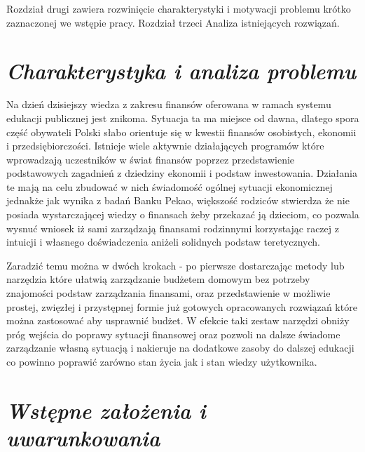 \documentclass[a4paper,10pt, twoside]{report}
\newcommand{\customstylechapter}[1]{\large{\textit{#1}}}
\begin{document}
{Rozdział drugi zawiera rozwinięcie charakterystyki i motywacji problemu krótko 
zaznaczonej we wstępie pracy. Rozdział trzeci Analiza istniejących rozwiązań.}

\chapter{\customstylechapter{Charakterystyka i analiza problemu}}

{Na dzień dzisiejszy wiedza z zakresu finansów oferowana w ramach systemu 
edukacji\cite{edukacjafinansowawszkołach} publicznej jest znikoma. Sytuacja ta 
ma miejsce od dawna, dlatego spora część obywateli Polski słabo orientuje się w 
kwestii finansów osobistych, ekonomii i przedsiębiorczości. Istnieje wiele 
aktywnie działających programów które wprowadzają uczestników w świat finansów 
poprzez przedstawienie podstawowych zagadnień z dziedziny ekonomii i podstaw 
inwestowania\cite{edukacjafinansowawszkołach}. Działania te mają na celu 
zbudować w nich świadomość ogólnej sytuacji ekonomicznej jednakże jak wynika z 
badań Banku Pekao\cite{edukacjafinansowamlodziezy}, większość rodziców stwierdza
 że nie posiada wystarczającej wiedzy o finansach żeby przekazać ją dzieciom, 
co pozwala wysnuć wniosek iż sami zarządzają finansami rodzinnymi korzystając 
raczej z intuicji i własnego doświadczenia aniżeli solidnych podstaw 
teretycznych.}

{Zaradzić temu można w dwóch krokach - po pierwsze dostarczając metody lub 
narzędzia które ułatwią zarządzanie budżetem domowym bez potrzeby znajomości 
podstaw zarządzania finansami, oraz przedstawienie w możliwie prostej, 
zwięzłej i przystępnej formie już gotowych opracowanych rozwiązań które można 
zastosować aby usprawnić budżet. W efekcie taki zestaw narzędzi obniży próg 
wejścia do poprawy sytuacji finansowej oraz pozwoli na dalsze świadome 
zarządzanie własną sytuacją i nakieruje na dodatkowe zasoby do dalszej edukacji 
co powinno poprawić zarówno stan życia jak i stan wiedzy użytkownika.}

\chapter{\customstylechapter{Wstępne założenia i uwarunkowania}}
\end{document}
